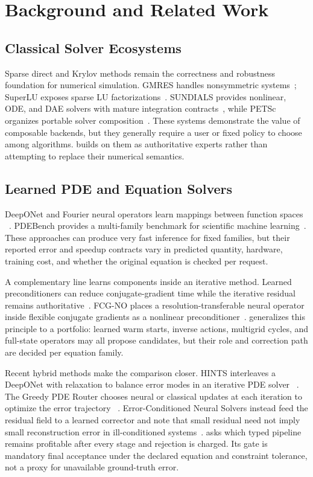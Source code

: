 \section{Background and Related Work}
\label{sec:related}

\subsection{Classical Solver Ecosystems}

Sparse direct and Krylov methods remain the correctness and robustness foundation
for numerical simulation. GMRES handles nonsymmetric systems~\cite{saad1986gmres};
SuperLU exposes sparse LU factorizations~\cite{li2005superlu}.
SUNDIALS provides nonlinear, ODE, and DAE solvers with mature integration
contracts~\cite{hindmarsh2005sundials}, while PETSc organizes portable solver
composition~\cite{balay1997petsc}. These
systems demonstrate the value of composable backends, but they generally require a
user or fixed policy to choose among algorithms. \system builds on them as
authoritative experts rather than attempting to replace their numerical semantics.

\subsection{Learned PDE and Equation Solvers}

DeepONet and Fourier neural operators learn mappings between function spaces
~\cite{lu2021deeponet,li2021fno}. PDEBench provides a multi-family benchmark for
scientific machine learning~\cite{takamoto2022pdebench}. These approaches can
produce very fast inference for fixed families, but their reported error and
speedup contracts vary in predicted quantity, hardware, training cost, and whether
the original equation is checked per request.

A complementary line learns components inside an iterative method. Learned
preconditioners can reduce conjugate-gradient time while the iterative residual
remains authoritative~\cite{li2023preconditioner}. FCG-NO places a
resolution-transferable neural operator inside flexible conjugate gradients as a
nonlinear preconditioner~\cite{rudikov2024fcgno}. \system generalizes this
principle to a portfolio: learned warm starts, inverse actions, multigrid cycles,
and full-state operators may all propose candidates, but their role and correction
path are decided per equation family.

Recent hybrid methods make the comparison closer. HINTS interleaves a DeepONet
with relaxation to balance error modes in an iterative PDE solver
~\cite{zhang2024hints}. The Greedy PDE Router chooses neural or classical updates
at each iteration to optimize the error trajectory
~\cite{rayan2025greedy}. Error-Conditioned Neural Solvers instead feed the
residual field to a learned corrector and note that small residual need not imply
small reconstruction error in ill-conditioned systems~\cite{jiang2026ens}.
\system asks which typed pipeline remains profitable after every stage and rejection
is charged. Its gate is mandatory final acceptance under the declared equation and
constraint tolerance, not a proxy for unavailable ground-truth error.

